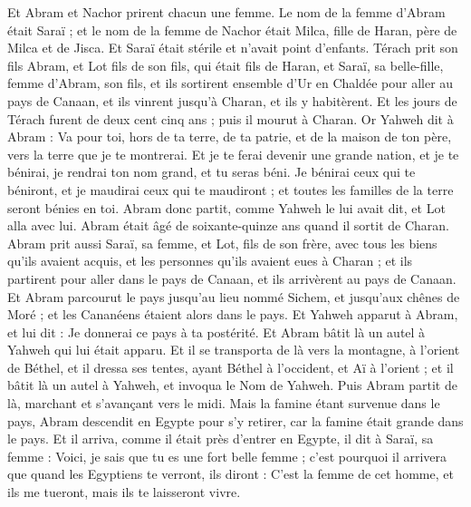 \begin{multicols}{2}
Et Abram et Nachor prirent chacun une femme. Le nom de la femme d'Abram était Saraï ; et le nom de la femme de Nachor était Milca, fille de Haran, père de Milca et de Jisca.
Et Saraï était stérile et n'avait point d'enfants.
Térach prit son fils Abram, et Lot fils de son fils, qui était fils de Haran, et Saraï, sa belle-fille, femme d'Abram, son fils, et ils sortirent ensemble d'Ur en Chaldée pour aller au pays de Canaan, et ils vinrent jusqu'à Charan, et ils y habitèrent.
Et les jours de Térach furent de deux cent cinq ans ; puis il mourut à Charan.
\VerseOne{}Or Yahweh dit à Abram : Va pour toi, hors de ta terre, de ta patrie, et de la maison de ton père, vers la terre que je te montrerai.
Et je te ferai devenir une grande nation, et je te bénirai, je rendrai ton nom grand, et tu seras béni.
Je bénirai ceux qui te béniront, et je maudirai ceux qui te maudiront ; et toutes les familles de la terre seront bénies en toi.
Abram donc partit, comme Yahweh le lui avait dit, et Lot alla avec lui. Abram était âgé de soixante-quinze ans quand il sortit de Charan.
Abram prit aussi Saraï, sa femme, et Lot, fils de son frère, avec tous les biens qu'ils avaient acquis, et les personnes qu'ils avaient eues à Charan ; et ils partirent pour aller dans le pays de Canaan, et ils arrivèrent au pays de Canaan.
Et Abram parcourut le pays jusqu'au lieu nommé Sichem, et jusqu'aux chênes de Moré ; et les Cananéens étaient alors dans le pays.
Et Yahweh apparut à Abram, et lui dit : Je donnerai ce pays à ta postérité. Et Abram bâtit là un autel à Yahweh qui lui était apparu.
Et il se transporta de là vers la montagne, à l'orient de Béthel, et il dressa ses tentes, ayant Béthel à l'occident, et Aï à l'orient ; et il bâtit là un autel à Yahweh, et invoqua le Nom de Yahweh.
Puis Abram partit de là, marchant et s'avançant vers le midi.
Mais la famine étant survenue dans le pays, Abram descendit en Egypte pour s'y retirer, car la famine était grande dans le pays.
Et il arriva, comme il était près d'entrer en Egypte, il dit à Saraï, sa femme : Voici, je sais que tu es une fort belle femme ;
c'est pourquoi il arrivera que quand les Egyptiens te verront, ils diront : C'est la femme de cet homme, et ils me tueront, mais ils te laisseront vivre.

\end{multicols}
